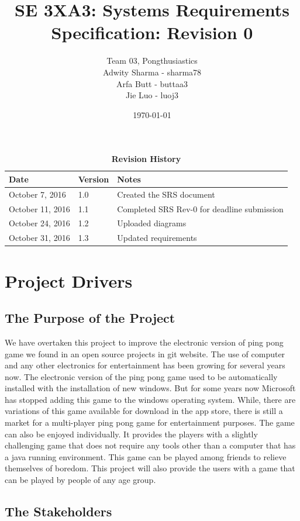 \documentclass[12pt,letterpaper]{article}
\title{SE 3XA3: Systems Requirements Specification: Revision 0}
\author{Team 03, Pongthusiastics 		
\\ Adwity Sharma - sharma78 		
\\ Arfa Butt - buttaa3 	
\\ Jie Luo - luoj3 }
\date{\today}
\begin{document}
\maketitle
\newpage
\tableofcontents
\listoftables
\listoffigures
\begin{table}[h]
\caption{\bf Revision History}
\begin{tabularx}{\textwidth}{p{3.5cm}p{2cm}X}
\toprule {\bf Date} & {\bf Version} & {\bf Notes}\\
\midrule
October 7, 2016 & 1.0 & Created the SRS document \\
October 11, 2016 & 1.1 & Completed SRS Rev-0 for deadline submission\\
October 24, 2016 & 1.2 & Uploaded diagrams \\
October 31, 2016 & 1.3 & Updated requirements \\
\bottomrule
\end{tabularx}
\end{table}
\newpage
	
	\section{Project Drivers}
	\subsection{The Purpose of the Project}
	We have overtaken this project to improve the electronic version of ping pong game we found in an open source projects in git website. The use of computer and any other electronics for entertainment has been growing for several years now. The electronic version of the ping pong game used to be automatically installed with the installation of new windows. But for some years now Microsoft has stopped adding this game to the windows operating system. While, there are variations of this game available for download in the app store, there is still a market for a multi-player ping pong game for entertainment purposes. The game can also be enjoyed individually. It provides the players with a slightly challenging game that does not require any tools other than a computer that has a java running environment. This game can be played among friends to relieve themselves of boredom. This project will also provide the users with a game that can be played by people of any age group. \\
	
	\subsection{The Stakeholders}
\end{document}
